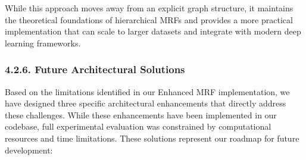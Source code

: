 \documentclass[conference]{IEEEtran}
\begin{document}
While this approach moves away from an explicit graph structure, it maintains the theoretical foundations of hierarchical MRFs and provides a more practical implementation that can scale to larger datasets and integrate with modern deep learning frameworks.

\subsubsection*{4.2.6. Future Architectural Solutions}

Based on the limitations identified in our Enhanced MRF implementation, we have designed three specific architectural enhancements that directly address these challenges. While these enhancements have been implemented in our codebase, full experimental evaluation was constrained by computational resources and time limitations. These solutions represent our roadmap for future development:
\end{document}

